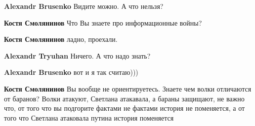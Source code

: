 \begin{itemize}
\begin{itemize}
 
\textbf{Alexandr Brusenko} Видите можно. А что нельзя?

 
\textbf{Костя Смолянинов} Что Вы знаете про информационные войны?

 
\textbf{Костя Смолянинов} ладно, проехали.

 
\textbf{Alexandr Tryuhan} Ничего. А что надо знать?

 
\textbf{Alexandr Brusenko} вот и я так считаю)))

 
\textbf{Костя Смолянинов} Вы вообще не ориентируетесь. Знаете чем волки отличаются от баранов? Волки атакуют, Светлана атакавала, а бараны защищают, не важно что, от того что вы подгорите фактами не фактами история не поменяется, а от того что Светлана атаковала путина история поменяется

 

\end{itemize}
\end{itemize}
